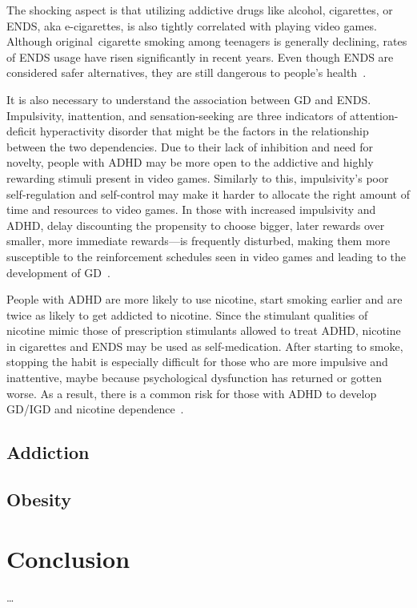 \documentclass[10pt,twoside,english,a4paper]{article}
\begin{document}
The shocking aspect is that utilizing addictive drugs like alcohol, cigarettes, or ENDS, aka e-cigarettes, is also tightly correlated with playing video games. Although original cigarette smoking among teenagers is generally declining, rates of ENDS usage have risen significantly in recent years. Even though ENDS are considered safer alternatives, they are still dangerous to people's health~\cite{disorder}.

It is also necessary to understand the association between GD and ENDS. Impulsivity, inattention, and sensation-seeking are three indicators of attention-deficit hyperactivity disorder that might be the factors in the relationship between the two dependencies. Due to their lack of inhibition and need for novelty, people with ADHD may be more open to the addictive and highly rewarding stimuli present in video games. Similarly to this, impulsivity's poor self-regulation and self-control may make it harder to allocate the right amount of time and resources to video games. In those with increased impulsivity and ADHD, delay discounting the propensity to choose bigger, later rewards over smaller, more immediate rewards—is frequently disturbed, making them more susceptible to the reinforcement schedules seen in video games and leading to the development of GD~\cite{disorder}.

People with ADHD are more likely to use nicotine, start smoking earlier and are twice as likely to get addicted to nicotine. Since the stimulant qualities of nicotine mimic those of prescription stimulants allowed to treat ADHD, nicotine in cigarettes and ENDS may be used as self-medication. After starting to smoke, stopping the habit is especially difficult for those who are more impulsive and inattentive, maybe because psychological dysfunction has returned or gotten worse. As a result, there is a common risk for those with ADHD to develop GD/IGD and nicotine dependence~\cite{disorder}.



\subsection{Addiction}


\subsection{Obesity}


\section{Conclusion} \label{conclusion}
\ldots




\end{document}
